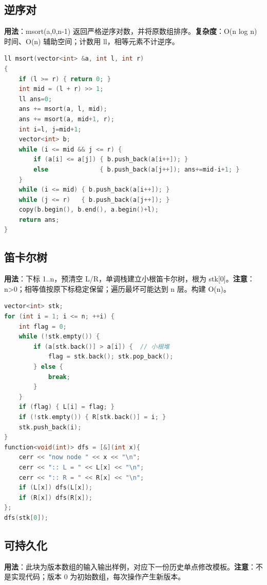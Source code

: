 \documentclass[a4paper,9pt]{extarticle}
\begin{document}
\subsection{逆序对}

\textbf{用法}：msort(\allowbreak{}a,\allowbreak{}0,\allowbreak{}n-\allowbreak{}1) 返回严格逆序对数，并将原数组排序。\textbf{复杂度}：O(n log n) 时间、O(n) 辅助空间；计数用 ll，相等元素不计逆序。

\begin{lstlisting}[language={C++}]
ll msort(vector<int> &a, int l, int r)
{
    if (l >= r) { return 0; }
    int mid = (l + r) >> 1;
    ll ans=0;
    ans += msort(a, l, mid);
    ans += msort(a, mid+1, r);
    int i=l, j=mid+1;
    vector<int> b;
    while (i <= mid && j <= r) {
        if (a[i] <= a[j]) { b.push_back(a[i++]); }
        else              { b.push_back(a[j++]); ans+=mid-i+1; }
    }
    while (i <= mid) { b.push_back(a[i++]); }
    while (j <= r)   { b.push_back(a[j++]); }
    copy(b.begin(), b.end(), a.begin()+l);
    return ans;
}
\end{lstlisting}

\subsection{笛卡尔树}

\textbf{用法}：下标 1..n，预清空 L/\allowbreak{}R，单调栈建立小根笛卡尔树，根为 stk[0]。\textbf{注意}：n>\allowbreak{}0；相等值按原下标稳定保留；遍历最坏可能达到 n 层。构建 O(n)。

\begin{lstlisting}[language={C++}]
vector<int> stk;
for (int i = 1; i <= n; ++i) {
	int flag = 0;
	while (!stk.empty()) {
		if (a[stk.back()] > a[i]) {  // 小根堆
			flag = stk.back(); stk.pop_back();
		} else {
			break;
		}
	}
	if (flag) { L[i] = flag; }
	if (!stk.empty()) { R[stk.back()] = i; }
	stk.push_back(i);
}
function<void(int)> dfs = [&](int x){
	cerr << "now node " << x << "\n";
	cerr << ":: L = " << L[x] << "\n";
	cerr << ":: R = " << R[x] << "\n";
	if (L[x]) dfs(L[x]);
	if (R[x]) dfs(R[x]);
};
dfs(stk[0]);
\end{lstlisting}

\subsection{可持久化}

\textbf{用法}：此块为版本数组的输入输出样例，对应下一份历史单点修改模板。\textbf{注意}：不是实现代码；版本 0 为初始数组，每次操作产生新版本。
\end{document}
